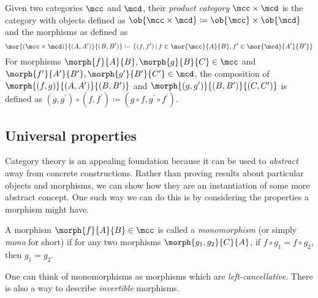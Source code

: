 \begin{example}
    Given two categories \(\mcc\) and \(\mcd\), their \emph{product category}
    \(\mcc \times \mcd\) is the category with objects defined as \(
    \ob{\mcc \times \mcd} \coloneqq \ob{\mcc} \times \ob{\mcd}
    \) and the morphisms as defined as \[
        \mor{(\mcc \times \mcd)}{(A, A^\prime)}{(B, B^\prime)}
        \coloneqq
        \{
        (f, f^\prime)
        \,|\,
        f \in \mor{\mcc}{A}{B},
        f^\prime \in \mor{\mcd}{A^\prime}{B^\prime}
        \}
    \]
    For morphisms \(\morph{f}{A}{B}, \morph{g}{B}{C} \in \mcc\) and \(
    \morph{f^\prime}{A^\prime}{B^\prime}, \morph{g^\prime}{B^\prime}{C^\prime}
    \in \mcd\), the composition of \(\morph{(f,g)}{(A,A^\prime)}{(B,B^\prime)}\)
    and \(\morph{(g,g^\prime)}{(B,B^\prime)}{(C,C^\prime)}\) is defined as \(
    (g, g^\prime) \circ (f, f^\prime)
    \coloneqq
    (g \circ f, g^\prime \circ f^\prime)\).
\end{example}

\subsection{Universal properties}

Category theory is an appealing foundation because it can be used to
\emph{abstract} away from concrete constructions.
Rather than proving results about particular objects and morphisms, we can
show how they are an instantiation of some more abstract concept.
One such way we can do this is by considering the properties a morphism might
have.

\begin{definition}[Monomorphism]
    A morphism \(\morph{f}{A}{B} \in \mcc\) is called a \emph{monomorphism} (or
    simply \emph{mono} for short) if for any two morphisms
    \(\morph{g_1,g_2}{C}{A}\), if \(f \circ g_1 = f \circ g_2\), then
    \(g_1 = g_2\).
    \begin{center}
    \end{center}
\end{definition}

One can think of monomorphisms as morphisms which are \emph{left-cancellative}.
There is also a way to describe \emph{invertible} morphisms.

